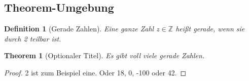 \documentclass[a4paper,12pt,twoside,headsepline]{scrartcl}
\newtheorem{definition}{Definition}
\newtheorem{theorem}{Theorem}
\begin{document}
                     
                     
\subsection{Theorem-Umgebung}

\begin{definition}[Gerade Zahlen]
 Eine ganze Zahl $z \in \mathbb Z$ heißt \emph{gerade}, wenn sie durch 2 teilbar ist.
\end{definition}

\begin{theorem}[Optionaler Titel]
 Es gibt voll viele gerade Zahlen.
\end{theorem}
\begin{proof}
 2 ist zum Beispiel eine. Oder 18, 0, -100 oder 42.
\end{proof}





\end{document}
